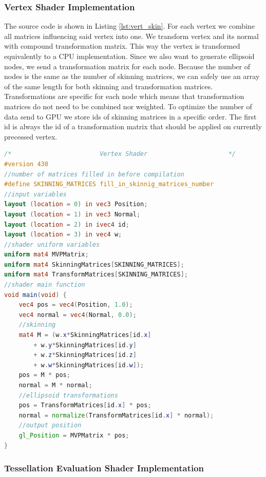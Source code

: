 \subsubsection{Vertex Shader Implementation}

The source code is shown in Listing \ref{lst:vert_skin}.
For each vertex we combine all matrices influencing said vertex into one.
We transform vertex and its normal with compound transformation matrix.
This way the vertex is transformed equivalently to a CPU implementation.
Since we also want to generate ellipsoid nodes, we send a transformation matrix for each node.
Because the number of nodes is the same as the number of skinning matrices, we can safely use an array of the same length for both skinning and transformation matrices.
Transformations are specific for each node which means that transformation matrices do not need to be combined nor weighted.
To optimize the number of data send to GPU we store ids of skinning matrices in a specific order.
The first id is always the id of a transformation matrix that should be applied on currently precessed vertex.

\linespread{1.2}
\begin{lstlisting}[language=GLSL,caption={Linear Blend Skinning implemented in vertex shader},label={lst:vert_skin}]
/*                        Vertex Shader                      */ 
#version 430
//number of matrices filled in before compilation
#define SKINNING_MATRICES fill_in_skinnig_matrices_number
//input variables
layout (location = 0) in vec3 Position;
layout (location = 1) in vec3 Normal;
layout (location = 2) in ivec4 id;
layout (location = 3) in vec4 w;
//shader uniform variables
uniform mat4 MVPMatrix;
uniform mat4 SkinningMatrices[SKINNING_MATRICES];
uniform mat4 TransformMatrices[SKINNING_MATRICES];
//shader main function
void main(void) {
	vec4 pos = vec4(Position, 1.0);
	vec4 normal = vec4(Normal, 0.0);
	//skinning
	mat4 M = (w.x*SkinningMatrices[id.x]
		+ w.y*SkinningMatrices[id.y] 
		+ w.z*SkinningMatrices[id.z] 
		+ w.w*SkinningMatrices[id.w]);
	pos = M * pos;
	normal = M * normal;
	//ellipsoid transformations
	pos = TransformMatrices[id.x] * pos;
	normal = normalize(TransformMatrices[id.x] * normal);
	//output position
	gl_Position = MVPMatrix * pos;
}
\end{lstlisting} 
\linespread{1.5}

\subsubsection{Tessellation Evaluation Shader Implementation}

